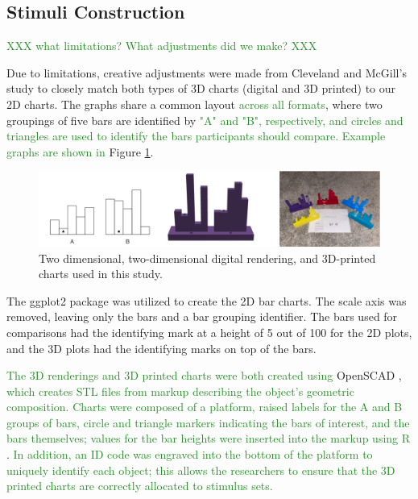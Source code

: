 \documentclass[letterpaper,inpress,dvipsnames]{jdsart}
\begin{document}
\hypertarget{stimuli-construction}{%
\subsection{Stimuli Construction}\label{stimuli-construction}}

{\textcolor{ForestGreen}{XXX what limitations? What adjustments did we make? XXX}}

Due to limitations, creative adjustments were made from Cleveland and McGill's study to closely match both types of 3D charts (digital and 3D printed) to our 2D charts.
The graphs share a common layout {\textcolor{ForestGreen}{across all formats}}, where two groupings of five bars are identified by {\textcolor{ForestGreen}{"A" and "B", respectively, and circles and triangles are used to identify the bars participants should compare. Example graphs are shown in}}
Figure \ref{fig:plotTypes}.

\begin{figure}
\includegraphics[width=1\linewidth]{plot-types} \caption{Two dimensional, two-dimensional digital rendering, and 3D-printed charts used in this study.}\label{fig:plotTypes}
\end{figure}

The ggplot2 \citep{ggplot2} package was utilized to create the 2D bar charts.
The scale axis was removed, leaving only the bars and a bar grouping identifier.
The bars used for comparisons had the identifying mark at a height of 5 out of 100 for the 2D plots, and the 3D plots had the identifying marks on top of the bars.

{\textcolor{ForestGreen}{The 3D renderings and 3D printed charts were both created using}} OpenSCAD \citep{kintelOpenSCADDocumentation2023}, {\textcolor{ForestGreen}{which creates STL files from markup describing the object's geometric composition. 
Charts were composed of a platform, raised labels for the A and B groups of bars, circle and triangle markers indicating the bars of interest, and the bars themselves; values for the bar heights were inserted into the markup using R}} \citep{R}.
{\textcolor{ForestGreen}{In addition, an ID code was engraved into the bottom of the platform to uniquely identify each object; this allows the researchers to ensure that the 3D printed charts are correctly allocated to stimulus sets.}}
\end{document}
